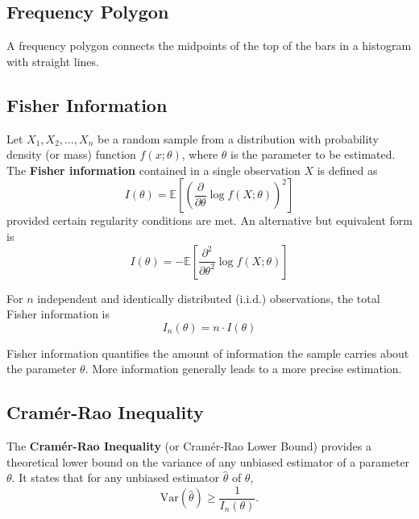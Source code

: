 \subsection{Frequency Polygon}

A frequency polygon connects the midpoints of the top of the bars in a histogram with straight lines.

\begin{center}

\subsection{Fisher Information}

Let $X_1, X_2, \dots, X_n$ be a random sample from a distribution with probability density (or mass) function $f(x; \theta)$, where $\theta$ is the parameter to be estimated. The \textbf{Fisher information} contained in a single observation $X$ is defined as
\[
I(\theta) = \mathbb{E} \left[ \left( \frac{\partial}{\partial\theta} \log f(X; \theta) \right)^2 \right]
\]
provided certain regularity conditions are met. An alternative but equivalent form is
\[
I(\theta) = -\mathbb{E} \left[ \frac{\partial^2}{\partial\theta^2} \log f(X; \theta) \right]
\]

For $n$ independent and identically distributed (i.i.d.) observations, the total Fisher information is
\[
I_n(\theta) = n \cdot I(\theta)
\]

Fisher information quantifies the amount of information the sample carries about the parameter $\theta$. More information generally leads to a more precise estimation.

\subsection{Cramér-Rao Inequality}

The \textbf{Cramér-Rao Inequality} (or Cramér-Rao Lower Bound) provides a theoretical lower bound on the variance of any unbiased estimator of a parameter $\theta$. It states that for any unbiased estimator $\hat{\theta}$ of $\theta$,
\[
\mathrm{Var}(\hat{\theta}) \geq \frac{1}{I_n(\theta)}.
\]


\end{center}
